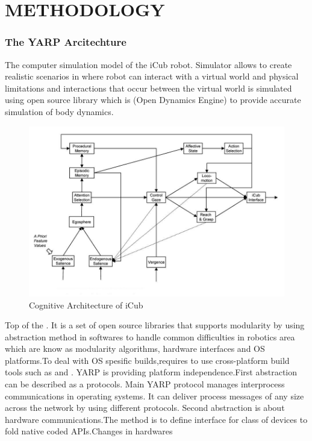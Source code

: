 \documentclass[a4paper, 11pt]{report}
\begin{document}
{\tiny}\chapter{METHODOLOGY}
  \subsection{The YARP Arcitechture}
The computer simulation model of the iCub robot. Simulator allows to 
create realistic scenarios in where robot can interact with a virtual world and 
physical limitations and interactions that occur between the virtual world is 
simulated using open source library which is \cite{ODE} (Open Dynamics Engine) 
to provide accurate simulation of body dynamics.
\begin{figure}[h!]
  \centering
  \includegraphics[width=1.0\linewidth]{cognitive_architecture}
  \caption{Cognitive Architecture of iCub}
  \label{fig:cognitive_architecture}
\end{figure}
Top of the \cite{YARP}. It is a set of open source 
libraries that supports modularity by using abstraction method in softwares 
to handle common difficulties in robotics area which are know as modularity 
algorithms, hardware interfaces and OS platforms.To deal with OS 
spesific builds,requires to use cross-platform build tools such as \cite{CMake} 
and \cite{ACE}. YARP is providing platform independence.First abstraction can 
be described as a protocols. Main YARP protocol manages interprocess 
communications in operating systems. It can deliver process messages of any 
size across the network by using different protocols.
\newpage
Second abstraction is about hardware communications.The method is to define 
interface for class of devices to fold native coded APIs.Changes in hardwares 
\end{document}
